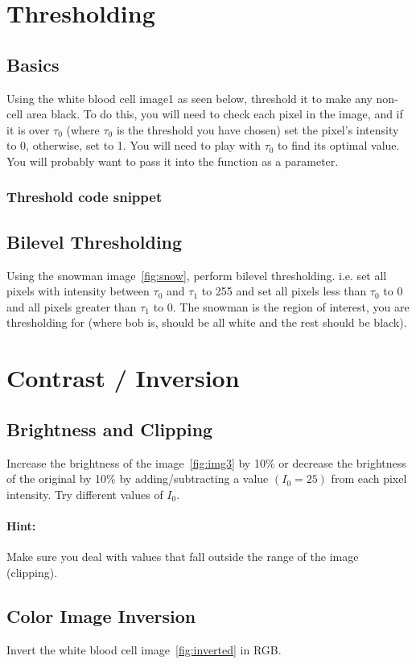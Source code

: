 \documentclass[a4paper]{article}
\newcommand{\code}[2]{
 \vspace{1em}
 \subsubsection*{#1}
 
}
\begin{document}
\section{Thresholding}

\subsection{Basics} Using the white blood cell image1 as seen below, threshold it to make any
non-cell area black. To do this, you will need to check each pixel in the image,
and if it is over $\tau_0$ (where $\tau_0$ is the threshold you have chosen) set the pixel’s
intensity to 0, otherwise, set to 1. You will need to play with $\tau_0$ to find its
optimal value. You will probably want to pass it into the function as a
parameter.
\code{Threshold code snippet}{threshold-code.sci}
\subsection{Bilevel Thresholding}
Using the snowman image~\ref{fig:snow}, perform bilevel thresholding. i.e. set all
pixels with intensity between $\tau_0$ and $\tau_1$ to 255 and set all pixels
less than $\tau_0$ 
to 0 and all pixels greater than $\tau_1$ to 0. The snowman is the region of interest,
you are thresholding for (where bob is, should be all white and the rest should
be black).

\section{Contrast / Inversion}

\subsection{Brightness and Clipping} Increase the brightness of the image~\ref{fig:img3} by 10\% 
or decrease the brightness of the original by 10\% by adding/subtracting a value
$(I_0=25)$ from each pixel intensity. Try different values of $I_0$.
\paragraph{Hint:} Make sure you deal with values that fall outside the range of
the image (clipping).

\subsection{Color Image Inversion} Invert the white blood cell
image~\ref{fig:inverted} in RGB.
\end{document}
